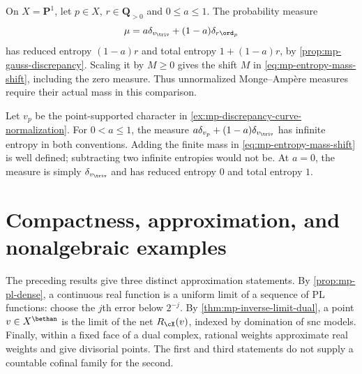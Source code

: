 \begin{example}
\label{ex:mp-entropy-shift-curve}
On $X=\mathbf P^1$, let $p\in X$, $r\in\mathbf Q_{>0}$ and
$0\leq a\leq1$. The probability measure
\[
 \mu=a\delta_{v_{\triv}}+(1-a)\delta_{r\ord_p}
\]
has reduced entropy $(1-a)r$ and total entropy $1+(1-a)r$, by
\cref{prop:mp-gauss-discrepancy}. Scaling it by $M\geq0$ gives the
shift $M$ in \eqref{eq:mp-entropy-mass-shift}, including the zero measure.
Thus unnormalized Monge--Amp\`ere measures require their actual mass in
this comparison.

Let $v_p$ be the point-supported character in
\cref{ex:mp-discrepancy-curve-normalization}. For $0<a\leq1$, the measure
$a\delta_{v_p}+(1-a)\delta_{v_{\triv}}$ has infinite entropy in both
conventions. Adding the finite mass in
\eqref{eq:mp-entropy-mass-shift} is well defined; subtracting two infinite
entropies would not be. At $a=0$, the measure is simply
$\delta_{v_{\triv}}$ and has reduced entropy $0$ and total entropy $1$.
\end{example}

\section{Compactness, approximation, and nonalgebraic examples}
\label{sec:mp-dual-approximation}

The preceding results give three distinct approximation statements.
By \cref{prop:mp-pl-dense}, a continuous real function is a uniform
limit of a sequence of PL functions: choose the $j$th error below
$2^{-j}$. By \cref{thm:mp-inverse-limit-dual}, a point
$v\in X^{\bethan}$ is the limit of the net $R_{\cX}(v)$,
indexed by domination of snc models. Finally, within a fixed
face of a dual complex, rational weights approximate real
weights and give divisorial points. The first and third
statements do not supply a countable cofinal family for the
second.

